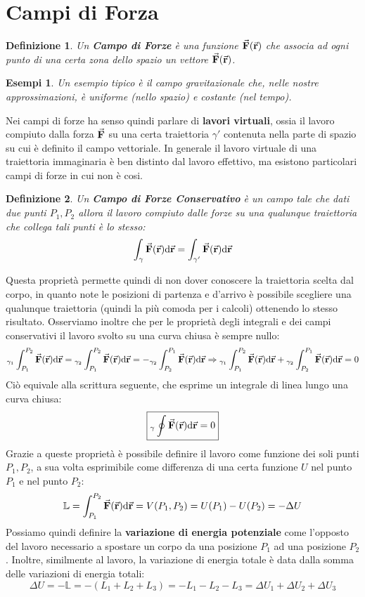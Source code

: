 \documentclass{article}
\newtheorem{defn}{Definizione}[section]
\newtheorem{example}{Esempi}[subsection]
\newcommand{\then}{\ensuremath{\Rightarrow}}
\renewcommand{\r}{\va{r}}
\newcommand{\F}{\va{F}}
\begin{document}
\section{Campi di Forza}
\begin{defn}
Un \textbf{Campo di Forze} è una funzione $\F(\r)$ che associa ad ogni punto di una certa zona dello spazio un vettore $\F(\r)$.
\end{defn}
\begin{example}
Un esempio tipico è il campo gravitazionale che, nelle nostre approssimazioni, è uniforme (nello spazio) e costante (nel tempo).
\end{example}
Nei campi di forze ha senso quindi parlare di \textbf{lavori virtuali}, ossia il lavoro compiuto dalla forza $\F$ su una certa traiettoria $\gamma'$ contenuta nella parte di spazio su cui è definito il campo vettoriale. In generale il lavoro virtuale di una traiettoria immaginaria è ben distinto dal lavoro effettivo, ma esistono particolari campi di forze in cui non è cosi.
\begin{defn}
Un \textbf{Campo di Forze Conservativo} è un campo tale che dati due punti $P_1,P_2$ allora il lavoro compiuto dalle forze su una qualunque traiettoria che collega tali punti è lo stesso:
\[\int_\gamma\F(\r)\dd\r=\int_{\gamma'}\F(\r)\dd\r\]
\end{defn}
Questa proprietà permette quindi di non dover conoscere la traiettoria scelta dal corpo, in quanto note le posizioni di partenza e d'arrivo è possibile scegliere una qualunque traiettoria (quindi la più comoda per i calcoli) ottenendo lo stesso risultato. Osserviamo inoltre che per le proprietà degli integrali e dei campi conservativi il lavoro svolto su una curva chiusa è sempre nullo:
\[ {}_{\gamma_1} \int_{P_1}^{P_2}\F(\r)\dd\r={}_{\gamma_2} \int_{P_1}^{P_2}\F(\r)\dd\r=-{}_{\gamma_2} \int_{P_2}^{P_1}\F(\r)\dd\r\then {}_{\gamma_1}\int_{P_1}^{P_2}\F(\r)\dd\r+{}_{\gamma_2} \int_{P_2}^{P_1}\F(\r)\dd\r=0 \]
Ciò equivale alla scrittura seguente, che esprime un integrale di linea lungo una curva chiusa:
\begin{equation}
    \boxed{{}_\gamma\oint\F(\r)\dd\r=0}
\end{equation}
Grazie a queste proprietà è possibile definire il lavoro come funzione dei soli punti $P_1,P_2$, a sua volta esprimibile come differenza di una certa funzione $U$ nel punto $P_1$ e nel punto $P_2$:
\[\mathbb{L}=\int_{P_1}^{P_2}\F(\r)\dd\r=V(P_1,P_2)=U(P_1)-U(P_2)=-\Delta U\]
Possiamo quindi definire la \textbf{variazione di energia potenziale} come l'opposto del lavoro necessario a spostare un corpo da una posizione $P_1$ ad una posizione $P_2$. Inoltre, similmente al lavoro, la variazione di energia totale è data dalla somma delle variazioni di energia totali:
\[\Delta U=-\mathbb{L}=-(L_1+L_2+L_3)=-L_1-L_2-L_3=\Delta U_1+\Delta U_2+\Delta U_3\]
\end{document}
